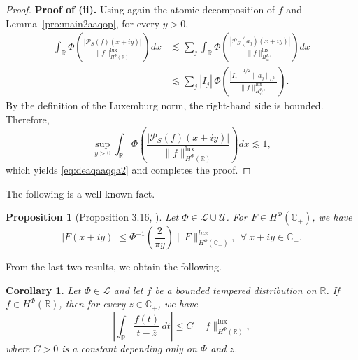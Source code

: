 \documentclass[a4paper,12pt,intlimits,oneside]{amsart}
\newtheorem{proposition}[theorem]{Proposition}
\newtheorem{corollaire}[theorem]{Corollary}
\theoremstyle{definition}
\numberwithin{equation}{section}
\theoremstyle{definition}
\begin{document}
\begin{proof}
\noindent\textbf{Proof of (ii).}
Using again the atomic decomposition of $f$ and Lemma~\ref{pro:main2aaqop}, for every $y>0$,
\begin{align*}
\int_{\mathbb{R}}
\Phi\!\left(
\frac{|\mathcal{P}_S(f)(x+iy)|}
{\|f\|_{H^{\Phi}(\mathbb{R})}^{\mathrm{lux}}}
\right)dx
&\lesssim
\sum_j
\int_{\mathbb{R}}
\Phi\!\left(
\frac{|\mathcal{P}_S(a_j)(x+iy)|}
{\|f\|_{H^{\Phi,s}_{\mathrm{at}}}^{\mathrm{lux}}}
\right)dx \\
&\lesssim
\sum_j
|I_j|\,
\Phi\!\left(
\frac{|I_j|^{-1/2}\|a_j\|_{L^2}}
{\|f\|_{H^{\Phi,s}_{\mathrm{at}}}^{\mathrm{lux}}}
\right).
\end{align*}
By the definition of the Luxemburg norm, the right-hand side is bounded. Therefore,
\[
\sup_{y>0}
\int_{\mathbb{R}}
\Phi\!\left(
\frac{|\mathcal{P}_S(f)(x+iy)|}
{\|f\|_{H^{\Phi}(\mathbb{R})}^{\mathrm{lux}}}
\right)dx
\lesssim 1,
\]
which yields \eqref{eq:deaqaaqqa2} and completes the proof.
\end{proof}

\medskip


The following is a well known fact.
\begin{proposition}[Proposition 3.16, \cite{djesehb1}]\label{pro:main6mq4}
Let  $\Phi \in \mathscr{L} \cup \mathscr{U}$. For  $F \in H^{\Phi}(\mathbb{C}_{+})$, we have
 \begin{equation}\label{eq:ualp5leson}
 |F(x+iy)|\leq \Phi^{-1}\left(\frac{2}{\pi y}\right)\|F\|_{H^{\Phi}(\mathbb{C}_{+})}^{lux}, ~~ \forall~x+iy \in \mathbb{C_{+}}.\end{equation}
 \end{proposition}



From the last two results, we obtain the following.
\begin{corollaire}\label{pro:main5aqpq5}
Let $\Phi \in \mathscr{L}$ and let $f$ be a bounded tempered distribution on $\mathbb{R}$. If $f \in H^{\Phi}(\mathbb{R})$, then for every $z \in \mathbb{C}_{+}$, we have
\begin{equation}\label{eq:uasoqan}
\left|\int_{\mathbb{R}}\frac{f(t)}{t-\overline{z}}\,dt\right|
\leq C\, \|f\|_{H^{\Phi}(\mathbb{R})}^{\mathrm{lux}},
\end{equation}
where $C>0$ is a constant depending only on $\Phi$ and $z$.
\end{corollaire}
\end{document}
